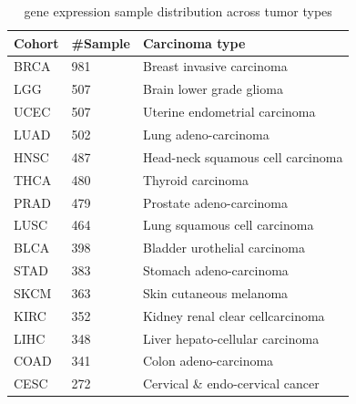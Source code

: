 
\iffalse
\begin{table} [!ht] 
    \begin{center}
    \scriptsize
    \caption{gene expression sample distribution across tumor types}
        \vspace{-2mm}
    \label{table:GE_dist}
    \begin{tabular}{l|l|l}
        \toprule
         \textbf{Cohort} & \textbf{\#Sample} & \textbf{Carcinoma type} \\\midrule
         BRCA & 981  & Breast invasive carcinoma  \\%
         LGG  & 507  & Brain lower grade glioma \\%
         UCEC & 507  & Uterine endometrial carcinoma \\%
         LUAD & 502  & Lung adeno-carcinoma \\%
         HNSC & 487  & Head-neck squamous cell carcinoma \\%
         THCA & 480  & Thyroid carcinoma \\%
         PRAD & 479  & Prostate adeno-carcinoma \\%
         LUSC & 464  & Lung squamous cell carcinoma \\%
         BLCA & 398  & Bladder urothelial carcinoma \\%
         STAD & 383  & Stomach adeno-carcinoma \\%
         SKCM & 363  & Skin cutaneous melanoma \\%
         KIRC & 352  & Kidney renal clear cellcarcinoma  \\%
         LIHC & 348  & Liver hepato-cellular carcinoma	\\%
         COAD & 341  & Colon adeno-carcinoma \\%
         CESC & 272  & Cervical \& endo-cervical cancer \\%

\end{tabular}
\end{center}
\end{table}
